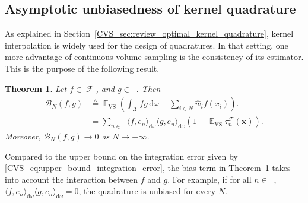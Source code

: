 \documentclass[twoside,11pt]{book}
\newtheorem{theorem}{Theorem}
\numberwithin{theorem}{chapter}
\numberwithin{definition}{chapter}
\numberwithin{proposition}{chapter}
\numberwithin{corollary}{chapter}
\numberwithin{example}{chapter}
\numberwithin{lemma}{chapter}
\numberwithin{assumption}{chapter}
\DeclareMathOperator{\VS}{\mathrm{VS}}
\DeclareMathOperator{\EX}{\mathbb{E}}
\DeclareMathOperator{\F}{\mathcal{F}}
\DeclareMathOperator{\X}{\mathcal{X}}
\DeclareMathOperator{\Ltwo}{\mathbb{L}_{2}(\mathrm{d} \omega)}
\DeclareMathOperator{\Ns}{\mathbb{N}^{*}}
\newcommand{\pc}[1]{\textcolor{blue}{#1}}
\begin{document}
\subsection{Asymptotic unbiasedness of kernel quadrature}\label{CVS_sec:unbiased_property}
As explained in Section~\ref{CVS_sec:review_optimal_kernel_quadrature}, kernel interpolation is widely used for the design of quadratures.
In that setting, one more advantage of continuous volume sampling is the consistency of its estimator. This is the purpose of the following result.
 \begin{theorem}\label{CVS_thm:EX_VS_integration_error}
Let $f \in \F$, and $g \in \Ltwo$. Then
\begin{align}
\mathcal{B}_{N}(f,g) & \triangleq \EX_{\VS} \left( \int_{\X}fg\,\mathrm{d}\omega -  \sum\limits_{i \in N} \hat{w}_{i}f(x_{i}) \right). \nonumber\\
 & = \sum\limits_{n \in \Ns} \langle f,e_{n} \rangle_{\mathrm{d}\omega} \langle g,e_{n} \rangle_{\mathrm{d}\omega}\left(1- \EX_{\VS}\tau_{n}^{\F}(\bm{x}) \right) . \nonumber%
\end{align}
Moreover,
$\mathcal{B}_{N}(f,g) \rightarrow 0$ as $N \rightarrow +\infty$.
\end{theorem}
Compared to the upper bound on the integration error given by \eqref{CVS_eq:upper_bound_integration_error}, the bias term in Theorem~\ref{CVS_thm:EX_VS_integration_error} takes into account the interaction between $f$ and $g$. For example, if for all $n \in \Ns$, $\langle f,e_{n} \rangle_{\mathrm{d}\omega} \langle g,e_{n} \rangle_{\mathrm{d}\omega} = 0$, the quadrature is unbiased for every $N$.
\end{document}
